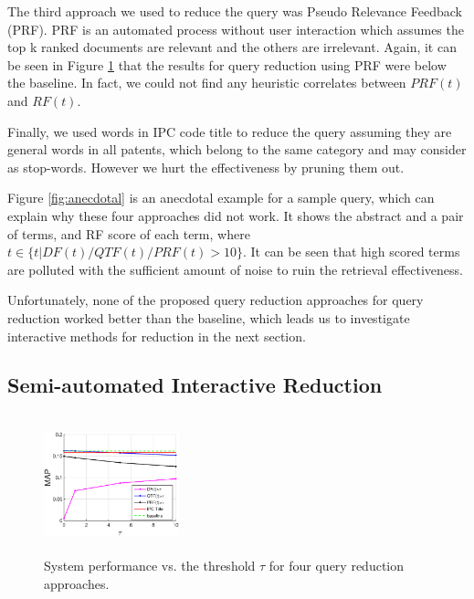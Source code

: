 The third approach we used to reduce the query was Pseudo Relevance Feedback (PRF). PRF is an automated process without user interaction which assumes the top k ranked documents are relevant and the others are irrelevant. Again, it can be seen in Figure \ref{fig:queryreduc} that the results for query reduction using PRF were below the baseline. In fact, we could not find any heuristic correlates between  $ PRF(t)$ and $ RF(t)$. 

Finally, we used words in IPC code title to reduce the query assuming they are general words in all patents, which belong to the same category and may consider as stop-words. However we hurt the effectiveness by pruning them out.

Figure \ref{fig:anecdotal} is an anecdotal example for a sample query, which can explain why these four approaches did not work. It shows the abstract and a pair of terms, and RF score of each term, where $t \in \{t| DF(t)/QTF(t)/PRF(t)>10\} $. It can be seen that high scored terms are polluted with the sufficient amount of noise to ruin the retrieval effectiveness.   

Unfortunately, none of the proposed query reduction approaches for query reduction worked better than the baseline, which leads us to investigate interactive methods for reduction in the next section.

\subsection{Semi-automated Interactive Reduction}

\begin{figure}[t!]
   \centering
   \includegraphics[width=0.35\textwidth,height=40mm]{figs/queryreduc-ipc-base-b.eps}
   \caption{System performance vs. the threshold $\tau$ for four query reduction approaches.}   
   \label{fig:queryreduc} 
\end{figure}

